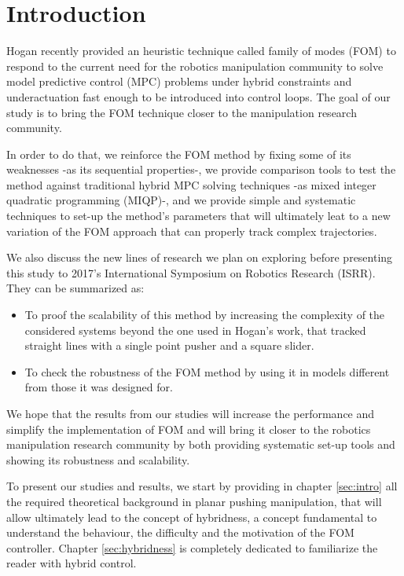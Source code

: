 \documentclass[12,twoside]{TFG-GM}
\theoremstyle{definition}
\theoremstyle{remark}
\begin{document}
\maketitle

                                                                      
\section{Introduction}
\label{briefgoal}
Hogan recently provided an heuristic technique called family of modes (FOM) \cite{fom} to respond to the current need for the robotics manipulation community to solve model predictive control (MPC) problems under hybrid constraints and underactuation fast enough to be introduced into control loops. The goal of our study is to bring the FOM technique closer to the manipulation research community.

In order to do that, we reinforce the FOM method by fixing some of its weaknesses -as its sequential properties-, we provide comparison tools to test the method against traditional hybrid MPC solving techniques -as mixed integer quadratic programming (MIQP)-, and we provide simple and systematic techniques to set-up the method's parameters that will ultimately leat to a new variation of the FOM approach that can properly track complex trajectories.

We also discuss the new lines of research we plan on exploring before presenting this study to 2017's International Symposium on Robotics Research (ISRR). They can be summarized as:
\begin{itemize}

\item To proof the scalability of this method by increasing the complexity of the considered systems beyond the one used in Hogan's work, that tracked straight lines with a single point pusher and a square slider.

\item To check the robustness of the FOM method by using it in models different from those it was designed for.
\end{itemize}

We hope that the results from our studies will increase the performance and simplify the implementation of FOM and will bring it closer to the robotics manipulation research community by both providing systematic set-up tools and showing its robustness and scalability.

To present our studies and results, we start by providing in chapter \ref{sec:intro} all the required theoretical background in planar pushing manipulation, that will allow ultimately lead to the concept of hybridness, a concept fundamental to understand the behaviour, the difficulty and the motivation of the FOM controller. Chapter \ref{sec:hybridness} is completely dedicated to familiarize the reader with hybrid control.
\end{document}
